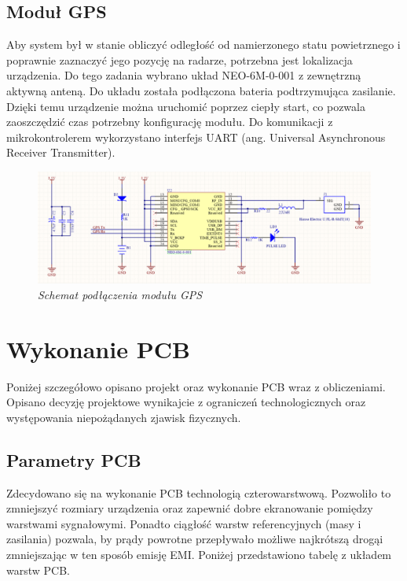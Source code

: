 \documentclass[eng,printmode]{mgr}
\begin{document}
\subsection*{Moduł GPS}
Aby system był w stanie obliczyć odległość od namierzonego statu powietrznego i poprawnie zaznaczyć jego pozycję na radarze, potrzebna jest lokalizacja urządzenia. Do tego zadania wybrano układ NEO-6M-0-001 z zewnętrzną aktywną anteną. Do układu została podłączona bateria podtrzymująca zasilanie. Dzięki temu urządzenie można uruchomić poprzez ciepły start, co pozwala zaoszczędzić czas potrzebny konfigurację modułu. Do komunikacji z mikrokontrolerem wykorzystano interfejs UART (ang. Universal Asynchronous Receiver Transmitter).
\begin{figure}[!h]
    \centering
    \includegraphics[width=\textwidth]{schematics/gps.png}
    \caption{\textit{Schemat podłączenia modułu GPS}}
\end{figure}
\newpage

\section{ Wykonanie PCB }
Poniżej szczegółowo opisano projekt oraz wykonanie PCB wraz z obliczeniami. Opisano decyzję projektowe wynikajcie z ograniczeń technologicznych oraz występowania niepożądanych zjawisk fizycznych.

\subsection*{Parametry PCB} \label{pcbSection}
Zdecydowano się na wykonanie PCB technologią czterowarstwową. Pozwoliło to zmniejszyć rozmiary urządzenia oraz zapewnić dobre ekranowanie pomiędzy warstwami sygnałowymi. Ponadto ciągłość warstw referencyjnych (masy i zasilania) pozwala, by prądy powrotne przepływało możliwe najkrótszą drogąi zmniejszając w ten sposób emisję EMI. Poniżej przedstawiono tabelę z układem warstw PCB.
\end{document}
